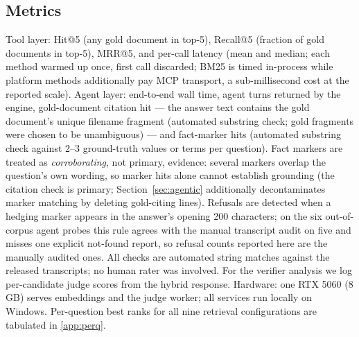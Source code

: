 \subsection{Metrics}
Tool layer: Hit@5 (any gold document in top-5), Recall@5 (fraction of gold
documents in top-5), MRR@5, and per-call latency (mean and median; each
method warmed up once, first call discarded; BM25 is timed in-process
while platform methods additionally pay MCP transport, a sub-millisecond
cost at the reported scale). Agent layer: end-to-end wall
time, agent turns returned by the engine, gold-document citation hit ---
the answer text contains the gold document's unique filename fragment
(automated substring check; gold fragments were chosen to be unambiguous) ---
and fact-marker hits (automated substring check against 2--3
ground-truth values or terms per question). Fact markers are treated as
\emph{corroborating}, not primary, evidence: several markers overlap the
question's own wording, so marker hits alone cannot establish grounding
(the citation check is primary; Section~\ref{sec:agentic} additionally
decontaminates marker matching by deleting gold-citing lines). Refusals
are detected when a hedging marker appears in the answer's opening 200
characters; on the six out-of-corpus agent probes this rule agrees with
the manual transcript audit on five and misses one explicit not-found
report, so refusal counts reported here are the manually audited ones. All checks
are automated string matches against the released transcripts; no human
rater was involved. For the verifier analysis we log per-candidate judge
scores from the hybrid response. Hardware: one RTX 5060 (8\,GB) serves
embeddings and the judge worker; all services run locally on Windows.
Per-question best ranks for all nine retrieval configurations are
tabulated in \ref{app:perq}.

